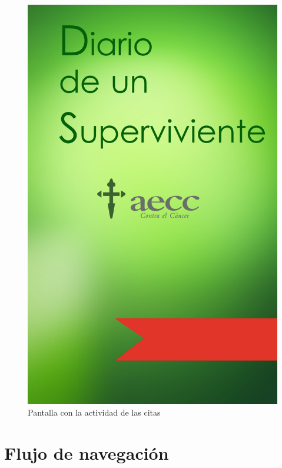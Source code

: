 \documentclass[../pfc.tex]{subfiles}
\begin{document}
		\begin{figure}[H]
			\centering
			\includegraphics[width=0.3\linewidth]{../images/flasher_pantalla_carga}
			\caption{Pantalla con la actividad de las citas}
			\label{fig:flasher_pantalla_carga}
		\end{figure}
		
		
	
	\section{Flujo de navegación}
	
	
\end{document}
